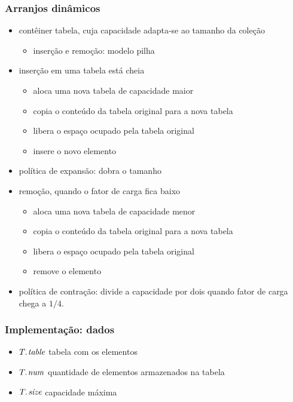 \documentclass{beamer}
\begin{document}
\begin{frame}
\frametitle{Arranjos dinâmicos}

\begin{itemize}

\item contêiner tabela, cuja capacidade adapta-se ao tamanho da coleção
\begin{itemize}
\item inserção e remoção: modelo pilha
\end{itemize}

\item inserção em uma tabela está cheia
\begin{itemize}
\item aloca uma nova tabela de capacidade maior
\item copia o conteúdo da tabela original para a nova tabela
\item libera o espaço ocupado pela tabela original
\item insere o novo elemento
\end{itemize}

\item política de expansão: dobra o tamanho

\item remoção, quando o fator de carga fica baixo
\begin{itemize}
\item aloca uma nova tabela de capacidade menor
\item copia o conteúdo da tabela original para a nova tabela
\item libera o espaço ocupado pela tabela original
\item remove o elemento
\end{itemize}

\item política de contração: divide a capacidade por dois quando fator de carga chega a $1/4$.
\end{itemize}
\end{frame}

\begin{frame}
\frametitle{Implementação: dados}

\begin{itemize}
\item $\attrib{T}{table}$ tabela com os elementos
\item $\attrib{T}{num}$ quantidade de elementos armazenados na tabela
\item $\attrib{T}{size}$ capacidade máxima
\end{itemize}

\end{frame}
\end{document}
